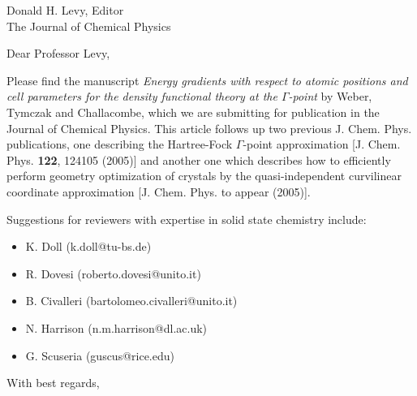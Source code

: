 
\pagestyle{empty}

\signature{V. Weber}

\address{
V. Weber \\
(valeryw@lanl.gov) \\
Theoretical Division \\
Group T-12, MS B268 \\
Los Alamos National Laboratory \\
Los Alamos, NM 87545 }

\date{February 6, 2006}

\begin{letter}{
    Donald H. Levy, Editor \\
    The Journal of Chemical Physics \\
}

\opening{Dear Professor Levy,}

Please find the manuscript 
{\em Energy gradients with respect to atomic positions and cell parameters
for the density functional theory at the $\Gamma$-point}
by Weber, Tymczak and Challacombe, which we are 
submitting for publication in the Journal of Chemical Physics. 
This article follows up two previous J. Chem. Phys. publications, one 
describing the Hartree-Fock $\Gamma$-point approximation [J. Chem. Phys. {\bf 122}, 124105 (2005)] 
and another one which describes how to efficiently perform geometry optimization of crystals by the 
quasi-independent curvilinear coordinate approximation [J. Chem. Phys. to appear (2005)].

Suggestions for reviewers with expertise in solid state chemistry include: 
\begin{itemize}
\item K. Doll (k.doll@tu-bs.de)
\item R. Dovesi (roberto.dovesi@unito.it)
\item B. Civalleri (bartolomeo.civalleri@unito.it)
\item N. Harrison (n.m.harrison@dl.ac.uk)
\item G. Scuseria (guscus@rice.edu)
\end{itemize}

\closing{With best regards,}
\end{letter}

